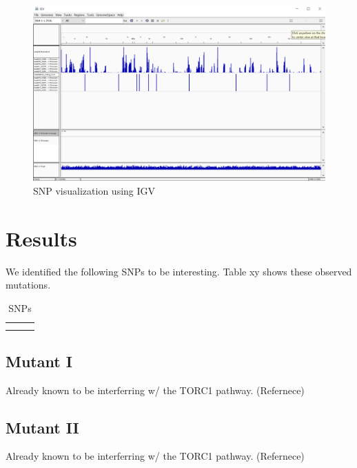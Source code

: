 \documentclass[10pt,a4paper]{article}
\begin{document}
\begin{description}
\begin{figure}[here]
\begin{center}
\includegraphics[width=\textwidth]{IGV_yeast}
\end{center}
\caption{SNP visualization using IGV}
\label{fig:yeastsnpigv}
\end{figure}


\end{description}

\section{Results}



We identified the following SNPs to be interesting. Table xy shows these observed mutations.

\begin{table}[]
\centering

\begin{tabular}{|l|l|l|}
\hline
 &  &  \\ \hline
 &  &  \\ \hline
 &  &  \\ \hline
\end{tabular}
\caption{SNPs}
\label{tab:yeastsnps}
\end{table}

\subsection{Mutant I}
Already known to be interferring w/ the TORC1 pathway. (Refernece)

\subsection{Mutant II}
Already known to be interferring w/ the TORC1 pathway. (Refernece)
\end{document}

